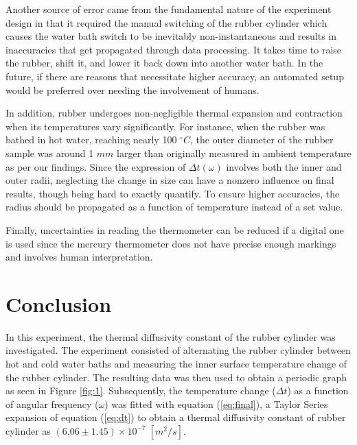 \documentclass[12pt]{article}
\begin{document}
Another source of error came from the fundamental nature of the experiment design in that it required the manual switching of the rubber cylinder which causes the water bath switch to be inevitably non-instantaneous and results in inaccuracies that get propagated through data processing. It takes time to raise the rubber, shift it, and lower it back down into another water bath. In the future, if there are reasons that necessitate higher accuracy, an automated setup would be preferred over needing the involvement of humans.

In addition, rubber undergoes non-negligible thermal expansion and contraction when its temperatures vary significantly. For instance, when the rubber was bathed in hot water, reaching nearly 100 $^\circ C$, the outer diameter of the rubber sample was around 1 $mm$ larger than originally measured in ambient temperature as per our findings. Since the expression of $\Delta t(\omega)$ involves both the inner and outer radii, neglecting the change in size can have a nonzero influence on final results, though being hard to exactly quantify. To ensure higher accuracies, the radius should be propagated as a function of temperature instead of a set value.

Finally, uncertainties in reading the thermometer can be reduced if a digital one is used since the mercury thermometer does not have precise enough markings and involves human interpretation.


\section{Conclusion}
In this experiment, the thermal diffusivity constant of the rubber cylinder was investigated. The experiment consisted of alternating the rubber cylinder between hot and cold water baths and measuring the inner surface temperature change of the rubber cylinder. The resulting data was then used to obtain a periodic graph as seen in Figure \ref{fig:1}. Subsequently, the temperature change ($\Delta t$) as a function of angular frequency ($\omega$) was fitted with equation (\ref{eq:final}), a Taylor Series expansion of equation (\ref{eq:dt}) to obtain a thermal diffusivity constant of rubber cylinder as $(6.06 \pm 1.45) \times 10^{-7}\; [m^{2}/s]$.
\end{document}
